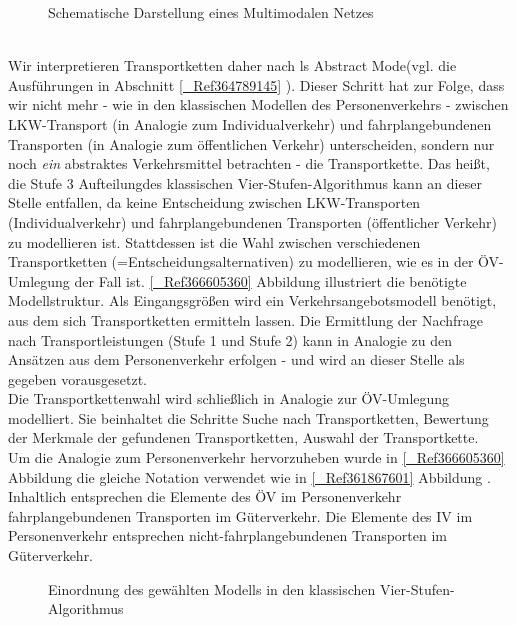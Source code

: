 \begin{figure}[htbp]
  \centering
  \caption{ Schematische Darstellung eines Multimodalen Netzes}
  \label{_Ref366606209}
\end{figure}
~\\
Wir interpretieren Transportketten daher nach  \citeauthor{bib.890} ls \glqq Abstract Mode\grqq  (vgl. die Ausführungen in Abschnitt \autoref{_Ref364789145} ). Dieser Schritt hat zur Folge, dass wir nicht mehr - wie in den klassischen Modellen des Personenverkehrs - zwischen LKW-Transport (in Analogie zum Individualverkehr) und fahrplangebundenen Transporten (in Analogie zum öffentlichen Verkehr) unterscheiden, sondern nur noch \emph{ein} abstraktes Verkehrsmittel betrachten - die Transportkette. Das heißt, die Stufe 3 \glqq Aufteilung\grqq  des klassischen Vier-Stufen-Algorithmus kann an dieser Stelle entfallen, da keine Entscheidung zwischen LKW-Transporten (Individualverkehr) und fahrplangebundenen Transporten (öffentlicher Verkehr) zu modellieren ist. Stattdessen ist die Wahl zwischen verschiedenen Transportketten (=Entscheidungsalternativen) zu modellieren, wie es in der ÖV-Umlegung der Fall ist. \autoref{_Ref366605360} Abbildung  illustriert die benötigte Modellstruktur. Als Eingangsgrößen wird ein Verkehrsangebotsmodell benötigt, aus dem sich Transportketten ermitteln lassen. Die Ermittlung der Nachfrage nach Transportleistungen (Stufe 1 und Stufe 2) kann in Analogie zu den Ansätzen aus dem Personenverkehr erfolgen - und wird an dieser Stelle als gegeben vorausgesetzt.~\\
Die Transportkettenwahl wird schließlich in Analogie zur ÖV-Umlegung modelliert. Sie beinhaltet die Schritte \glqq Suche nach Transportketten\grqq , \glqq Bewertung der Merkmale der gefundenen Transportketten\grqq , \glqq Auswahl der Transportkette\grqq .~\\
Um die Analogie zum Personenverkehr hervorzuheben wurde in \autoref{_Ref366605360} Abbildung  die gleiche Notation verwendet wie in \autoref{_Ref361867601} Abbildung . Inhaltlich entsprechen die Elemente des ÖV im Personenverkehr fahrplangebundenen Transporten im Güterverkehr. Die Elemente des IV im Personenverkehr entsprechen nicht-fahrplangebundenen Transporten im Güterverkehr.~\\
 
\begin{figure}[htbp]
  \centering
  \caption{ Einordnung des gewählten Modells in den klassischen Vier-Stufen-Algorithmus}
  \label{_Ref366605360}
\end{figure}
~\\


